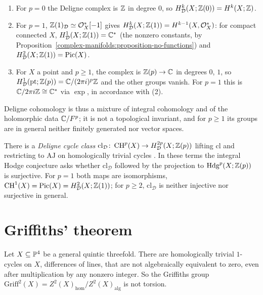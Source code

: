 \begin{example}\label{intermediate-jacobians:example-deligne-low-degree}
\begin{enumerate}
\item For $p = 0$ the Deligne complex is $\mathbb{Z}$ in degree $0$, so $H^k_{\mathcal{D}}(X; \mathbb{Z}(0)) = H^k(X; \mathbb{Z})$.
\item For $p = 1$, $\mathbb{Z}(1)_{\mathcal{D}} \simeq \mathcal{O}_X^*[-1]$ gives $H^k_{\mathcal{D}}(X; \mathbb{Z}(1)) = H^{k-1}(X, \mathcal{O}_X^*)$: for compact connected $X$, $H^1_{\mathcal{D}}(X; \mathbb{Z}(1)) = \mathbb{C}^*$ (the
nonzero constants, by Proposition~\ref{complex-manifolds:proposition-no-functions}) and $H^2_{\mathcal{D}}(X; \mathbb{Z}(1)) = \operatorname{Pic}(X)$.
\item For $X$ a point and $p \geq 1$, the complex is $\mathbb{Z}(p) \to \mathbb{C}$ in degrees $0$, $1$, so $H^1_{\mathcal{D}}(\mathrm{pt}; \mathbb{Z}(p)) = \mathbb{C}/(2\pi i)^p\mathbb{Z}$ and the other groups vanish. For $p = 1$ this is
$\mathbb{C}/2\pi i\mathbb{Z} \cong \mathbb{C}^*$ via $\exp$, in accordance with (2).
\end{enumerate}
Deligne cohomology is thus a mixture of integral cohomology and of the holomorphic data $\mathbb{C}/F^p$; it is not a topological invariant, and for $p \geq 1$ its groups are in general neither finitely generated nor
vector spaces.
\end{example}

\begin{remark}\label{intermediate-jacobians:remark-deligne-cycle-class}
There is a \emph{Deligne cycle class} $\mathrm{cl}_{\mathcal{D}} \colon \operatorname{CH}^p(X) \to H^{2p}_{\mathcal{D}}(X; \mathbb{Z}(p))$ lifting $\mathrm{cl}$ and restricting to $\mathrm{AJ}$ on homologically trivial cycles
\cite[Chapter 12]{voisin-hodge-1}. In these terms the integral Hodge conjecture asks whether $\mathrm{cl}_{\mathcal{D}}$ followed by the projection to $\mathrm{Hdg}^p(X; \mathbb{Z}(p))$ is surjective. For
$p = 1$ both maps are isomorphisms, $\operatorname{CH}^1(X) = \operatorname{Pic}(X) = H^2_{\mathcal{D}}(X; \mathbb{Z}(1))$; for $p \geq 2$, $\mathrm{cl}_{\mathcal{D}}$ is neither injective nor surjective in general.
\end{remark}

\section{Griffiths' theorem}\label{intermediate-jacobians:section-griffiths}

\begin{theorem}[Griffiths]\label{intermediate-jacobians:theorem-griffiths}
Let $X \subseteq \mathbb{P}^4$ be a general quintic threefold. There are homologically trivial $1$-cycles on $X$, differences of lines, that are not algebraically equivalent to zero, even after multiplication
by any nonzero integer. So the Griffiths group $\mathrm{Griff}^2(X) = Z^2(X)_{\mathrm{hom}}/Z^2(X)_{\mathrm{alg}}$ is not torsion.
\end{theorem}

